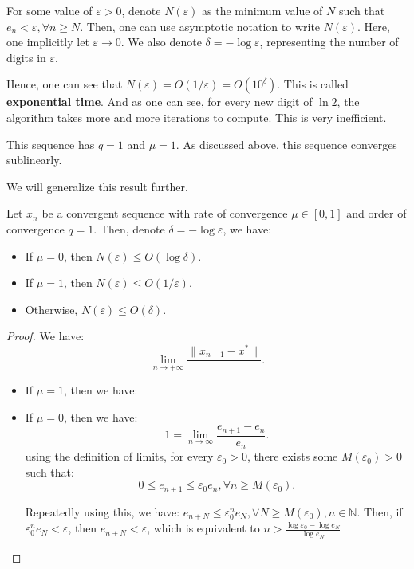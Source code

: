 For some value of \( \varepsilon > 0 \), denote \( N(\varepsilon) \) as the
minimum value of \( N \) such that \( e_{n} < \varepsilon, \forall  n \ge N \).
Then, one can use asymptotic notation to write \( N(\varepsilon) \). Here, one
implicitly let \( \varepsilon \to 0 \). We also denote \( \delta = -\log
\varepsilon \), representing the number of digits in \( \varepsilon \).


Hence, one can see that \( N(\varepsilon) = O \left( 1 / \varepsilon
\right)  = O(10^{\delta}) \). This is called \textbf{exponential time}. And as
one can see, for every new digit of \( \ln 2 \), the algorithm takes more and more
iterations to compute. This is very inefficient.

This sequence has \( q = 1 \) and \( \mu = 1 \). As discussed above, this
sequence converges sublinearly.

We will generalize this result further.

\begin{theorem}
\label{thr:Iteration complexity of linear convergence}
Let \( x_{n} \) be a convergent sequence with rate of convergence \( \mu \in[0,
1]  \) and order of convergence \( q = 1 \). Then, denote \( \delta = -\log
\varepsilon \), we have:
\begin{itemize}
\item If \( \mu  = 0 \), then \( N(\varepsilon) \le O(\log \delta) \).
\item If \( \mu = 1 \), then \( N(\varepsilon) \le  O(1 / \varepsilon) \).
\item Otherwise, \( N(\varepsilon) \le  O(\delta) \).
\end{itemize}
\end{theorem}

\begin{proof}
  We have:
  \[
    \lim_{n \to +\infty} \frac{\|x_{n + 1} - x^{*}\|}{}
  .\] 
\begin{itemize}
\item If \( \mu  = 1 \), then we have:
\item If \( \mu  = 0 \), then we have:
  \[
    1 = \lim_{n \to \infty} \frac{e_{n + 1} - e_{n}}{e_{n}} 
  .\] 
  using the definition of limits, for every \(
  \varepsilon_{0} > 0 \), there exists some \( M(\varepsilon_{0}) > 0 \)
  such that:
  \[
    0 \le  e_{n + 1}  \le \varepsilon_{0} e_{n}, \forall n \ge  M(\varepsilon_{0}) 
  .\] 

  Repeatedly using this, we have: \( e_{n + N} \le \varepsilon_{0}^{n} e_{N}, \forall N \ge
  M(\varepsilon_{0}), n \in \mathbb{N}\). Then, if \( \varepsilon_{0} ^{n}e_{N} <
  \varepsilon \), then \( e_{n + N} < \varepsilon \), which is equivalent to \(n
  > \frac{\log \varepsilon_{0} - \log e_{N}}{\log e_{N}}
  \)

\end{itemize}
\end{proof}

